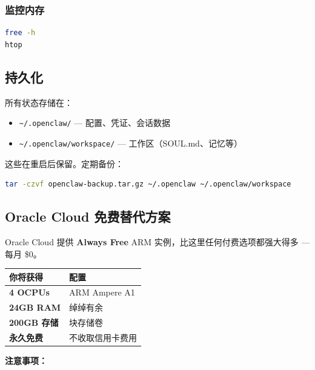 \subsubsection{监控内存}


\begin{lstlisting}[language=bash]
free -h
htop
\end{lstlisting}


\hrulefill


\subsection{持久化}


所有状态存储在：

\begin{itemize}
  \item \texttt{\textasciitilde{}/.openclaw/} — 配置、凭证、会话数据
  \item \texttt{\textasciitilde{}/.openclaw/workspace/} — 工作区（SOUL.md、记忆等）
\end{itemize}


这些在重启后保留。定期备份：

\begin{lstlisting}[language=bash]
tar -czvf openclaw-backup.tar.gz ~/.openclaw ~/.openclaw/workspace
\end{lstlisting}


\hrulefill


\subsection{Oracle Cloud 免费替代方案}


Oracle Cloud 提供 \textbf{Always Free} ARM 实例，比这里任何付费选项都强大得多 — 每月 \$0。


\begin{table}[h]
\centering
\small
\begin{tabular}{|l|l|}
\hline
你将获得 & 配置 \\
\hline
\textbf{4 OCPUs} & ARM Ampere A1 \\
\hline
\textbf{24GB RAM} & 绰绰有余 \\
\hline
\textbf{200GB 存储} & 块存储卷 \\
\hline
\textbf{永久免费} & 不收取信用卡费用 \\
\hline
\end{tabular}
\end{table}



\textbf{注意事项：}

